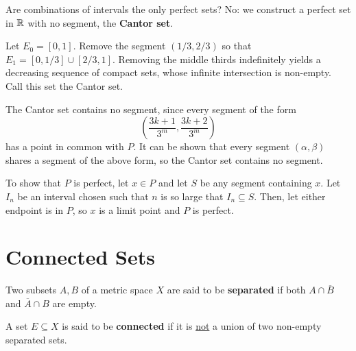 Are combinations of intervals the only perfect sets? No: we construct a perfect set in $\mathbb{R}$ with no segment, the \textbf{Cantor set}. 

Let $E_0 = [0, 1]$. Remove the segment $(1/3, 2/3)$ so that $E_1 = [0, 1/3] \cup [2/3, 1]$. Removing the middle thirds indefinitely yields a decreasing sequence of compact sets, whose infinite intersection is non-empty. Call this set the Cantor set.

The Cantor set contains no segment, since every segment of the form
\[
	\left(\frac{3k + 1}{3^m}, \frac{3k + 2}{3^m}\right)
\]
has a point in common with $P$. It can be shown that every segment $(\alpha, \beta)$ shares a segment of the above form, so the Cantor set contains no segment.

To show that $P$ is perfect, let $x \in P$ and let $S$ be any segment containing $x$. Let $I_n$ be an interval chosen such that $n$ is so large that $I_n \subseteq S$. Then, let either endpoint is in $P$, so $x$ is a limit point and $P$ is perfect.

\section{Connected Sets}

\begin{definition}
Two subsets $A, B$ of a metric space $X$ are said to be \textbf{separated} if both $A \cap \overline{B}$ and $\overline{A} \cap B$ are empty. 

A set $E \subseteq X$ is said to be \textbf{connected} if it is \underline{not} a union of two non-empty separated sets.
\end{definition}


